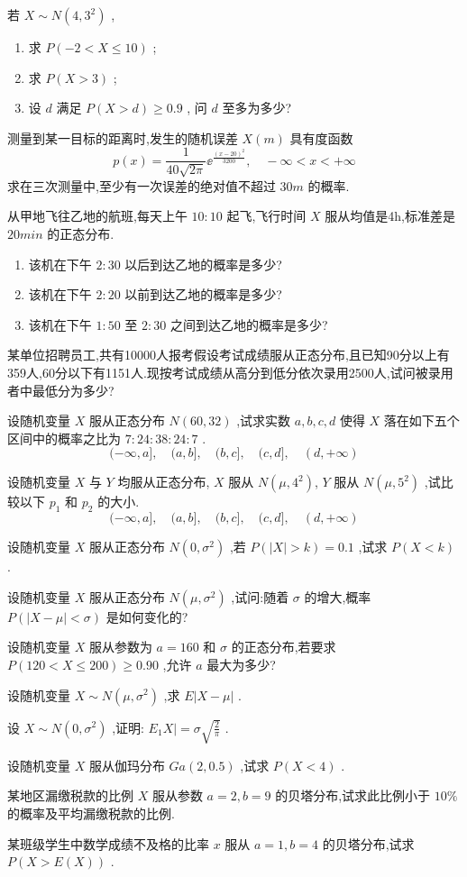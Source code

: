 \begin{xiti}
\begin{enumerate}
\end{enumerate}
\item 若 $ X \sim N\left(4,3^{2}\right) $ ,
\begin{enumerate}
	\item 求 $ P(-2<X \leqslant 10) $ ;
	\item 求 $ P(X>3) $ ;
	\item 设 $ d $ 满足 $ P(X>d)  \geqslant 0.9 $ , 问 $ d $ 至多为多少?
\end{enumerate}
\item 测量到某一目标的距离时,发生的随机误差 $ X(m) $ 具有度函数
\[
p(x)=\frac{1}{40 \sqrt{2 \pi}} \ee ^{\frac{(x-20)^{2}}{3200}}, \quad-\infty<x<+\infty
\]
求在三次测量中,至少有一次误差的绝对值不超过 $ 30m $ 的概率.
\item 从甲地飞往乙地的航班,每天上午 $ 10:10 $ 起飞,飞行时间 $ X $ 服从均值是4h,标准差是 $ 20min $ 的正态分布.
\begin{enumerate}
	\item 该机在下午 $ 2:30 $ 以后到达乙地的概率是多少?
	\item 该机在下午 $ 2:20 $ 以前到达乙地的概率是多少?
	\item 该机在下午 $ 1:50 $ 至 $ 2:30 $ 之间到达乙地的概率是多少?
\end{enumerate}
\item 某单位招聘员工,共有10000人报考假设考试成绩服从正态分布,且已知90分以上有359人,60分以下有1151人.现按考试成绩从高分到低分依次录用2500人,试问被录用者中最低分为多少?
\item 设随机变量 $ X $ 服从正态分布 $ N(60,32) $ ,试求实数 $ a,b,c,d $ 使得 $ X $ 落在如下五个区间中的概率之比为 $ 7:24:38:24:7 $ .
\[
(-\infty, a], \quad(a, b], \quad(b, c], \quad(c, d], \quad(d,+\infty)
\]
\item 设随机变量 $ X $ 与 $ Y $ 均服从正态分布, $ X $ 服从 $ N\left(\mu, 4^{2}\right) $, $ Y $ 服从 $ N\left(\mu, 5^{2}\right) $ ,试比较以下 $ p_{1} $ 和 $ p_{2} $ 的大小.
\[
(-\infty, a], \quad(a, b], \quad(b, c], \quad(c, d], \quad(d,+\infty)
\]
\item 设随机变量 $ X $ 服从正态分布 $ N\left(0, \sigma^{2}\right) $ ,若 $ P(|X|>k)=0.1 $ ,试求 $ P(X<k) $ .
\item 设随机变量 $ X $ 服从正态分布 $ N\left(\mu, \sigma^{2}\right) $ ,试问:随着 $ \sigma $ 的增大,概率 $ P(|X-\mu|<\sigma) $ 是如何变化的?
\item 设随机变量 $ X $ 服从参数为 $ a=160 $ 和 $ \sigma $ 的正态分布,若要求 $ P(120<X \leqslant 200) \geqslant 0.90 $ ,允许 $ a $ 最大为多少?
\item 设随机变量 $ X \sim N\left(\mu, \sigma^{2}\right) $ ,求 $ E | X-\mu | $ .
\item 设 $ X \sim N\left(0, \sigma^{2}\right) $ ,证明: $ E_{1} X |=\sigma \sqrt{\tfrac{2}{\pi}} $ .
\item 设随机变量 $ X $ 服从伽玛分布 $ G a(2,0.5) $ ,试求 $ P(X<4) $ .
\item 某地区漏缴税款的比例 $ X $ 服从参数 $ a=2,b=9 $ 的贝塔分布,试求此比例小于 $ 10\% $ 的概率及平均漏缴税款的比例.
\item 某班级学生中数学成绩不及格的比率 $ x $ 服从 $ a=1,b=4 $ 的贝塔分布,试求 $ P(X>E(X)) $ .
\end{xiti}

